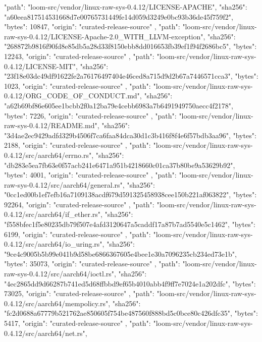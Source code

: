 {{      "path": "loom-src/vendor/linux-raw-sys-0.4.12/LICENSE-APACHE",
      "sha256": "a60eea817514531668d7e00765731449fe14d059d3249e0bc93b36de45f759f2",
      "bytes": 10847,
      "origin": "curated-release-source"
    },
    {
      "path": "loom-src/vendor/linux-raw-sys-0.4.12/LICENSE-Apache-2.0_WITH_LLVM-exception",
      "sha256": "268872b9816f90fd8e85db5a28d33f8150ebb8dd016653fb39ef1f94f2686bc5",
      "bytes": 12243,
      "origin": "curated-release-source"
    },
    {
      "path": "loom-src/vendor/linux-raw-sys-0.4.12/LICENSE-MIT",
      "sha256": "23f18e03dc49df91622fe2a76176497404e46ced8a715d9d2b67a7446571cca3",
      "bytes": 1023,
      "origin": "curated-release-source"
    },
    {
      "path": "loom-src/vendor/linux-raw-sys-0.4.12/ORG_CODE_OF_CONDUCT.md",
      "sha256": "a62b69bf86e605ee1bcbb2f0a12ba79e4cebb6983a7b6491949750aecc4f2178",
      "bytes": 7226,
      "origin": "curated-release-source"
    },
    {
      "path": "loom-src/vendor/linux-raw-sys-0.4.12/README.md",
      "sha256": "3d4ae2ec9429adfd329b4506f7ca6faa84dca30d1c3b416f8f4e6f57bdb3aa96",
      "bytes": 2188,
      "origin": "curated-release-source"
    },
    {
      "path": "loom-src/vendor/linux-raw-sys-0.4.12/src/aarch64/errno.rs",
      "sha256": "db283e5ea7fb63e0f57acb241e6471a951b4218660c01ca37b80be9a53629b92",
      "bytes": 4001,
      "origin": "curated-release-source"
    },
    {
      "path": "loom-src/vendor/linux-raw-sys-0.4.12/src/aarch64/general.rs",
      "sha256": "0cc1ed00b1ef7efb16a7109138acdf679d591325458938cee150b221af063822",
      "bytes": 92264,
      "origin": "curated-release-source"
    },
    {
      "path": "loom-src/vendor/linux-raw-sys-0.4.12/src/aarch64/if_ether.rs",
      "sha256": "f558bfec1f5e80235db79f507e4afd3120647a5caddf17a87b7ad5540e5c1462",
      "bytes": 6199,
      "origin": "curated-release-source"
    },
    {
      "path": "loom-src/vendor/linux-raw-sys-0.4.12/src/aarch64/io_uring.rs",
      "sha256": "9ce4c9005b5b99e041b9d58be6866367605e4bee1e30a7096235cb234ed73e1b",
      "bytes": 35073,
      "origin": "curated-release-source"
    },
    {
      "path": "loom-src/vendor/linux-raw-sys-0.4.12/src/aarch64/ioctl.rs",
      "sha256": "4ec2865dd9d66287b741ed5d68ffbbd9ef65b4010abb4f9ff7e7024e1a202dfc",
      "bytes": 73025,
      "origin": "curated-release-source"
    },
    {
      "path": "loom-src/vendor/linux-raw-sys-0.4.12/src/aarch64/mempolicy.rs",
      "sha256": "fc2d0688a67779b521762ae850605f754be487560f888bd5c0bce80c426dfc35",
      "bytes": 5417,
      "origin": "curated-release-source"
    },
    {
      "path": "loom-src/vendor/linux-raw-sys-0.4.12/src/aarch64/net.rs",
}}
